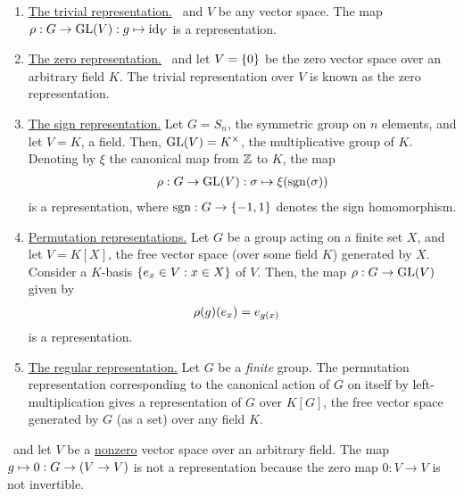\begin{boxexample}
    \hfill
    \begin{enumerate}
        \item \underline{The trivial representation.} \ and $V$ be any vector space. The map $\rho : G \to \operatorname{GL}\!\left( V \right) : g \mapsto \operatorname{id}_{V}$ is a representation.
        
        \item \underline{The zero representation.} \ and let $V = \left\{ 0 \right\}$ be the zero vector space over an arbitrary field $K$. The trivial representation over $V$ is known as the zero representation.
        
        \item \underline{The sign representation.} Let $G = S_n$, the symmetric group on $n$ elements, and let $V = K$, a field. Then, $\operatorname{GL}\!\left( V \right) = K^{\times}$, the multiplicative group of $K$. Denoting by $\xi$ the canonical map from $\mathbb{Z}$ to $K$, the map
        \begin{align*}
            \rho : G \to \operatorname{GL}\!\left( V \right) : \sigma \mapsto \xi\!\left( \operatorname{sgn}\!\left( \sigma \right) \right)
        \end{align*}
        is a representation, where $\operatorname{sgn} : G \to \left\{ -1,1 \right\}$ denotes the sign homomorphism.

        \item \underline{Permutation representations.} Let $G$ be a group acting on a finite set $X$, and let $V = K[X]$, the free vector space (over some field $K$) generated by $X$. Consider a $K$-basis $\left\{ e_x \in V : x \in X \right\}$ of $V$. Then, the map $\rho : G \to \operatorname{GL}\!\left( V \right)$ given by
        \begin{align*}
            \rho\!\left( g \right)\!\left( e_x \right) &= e_{g(x)}
        \end{align*}
        is a representation.

        \item \underline{The regular representation.} Let $G$ be a \textit{finite} group. The permutation representation corresponding to the canonical action of $G$ on itself by left-multiplication gives a representation of $G$ over $K[G]$, the free vector space generated by $G$ (as a set) over any field $K$.
    \end{enumerate}
\end{boxexample}

\begin{boxnexample}
    \ and let $V$ be a \underline{nonzero} vector space over an arbitrary field. The map $g \mapsto 0 : G \to \left( V \to V \right)$ is not a representation because the zero map $0 : V \to V$ is not invertible.
\end{boxnexample}


